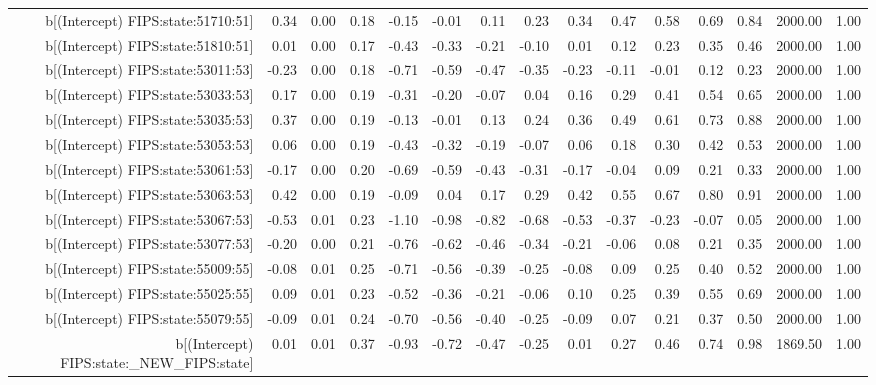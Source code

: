 \begin{table}[ht]
\begin{tabular}{rrrrrrrrrrrrrrr}
  b[(Intercept) FIPS:state:51710:51] & 0.34 & 0.00 & 0.18 & -0.15 & -0.01 & 0.11 & 0.23 & 0.34 & 0.47 & 0.58 & 0.69 & 0.84 & 2000.00 & 1.00 \\ 
  b[(Intercept) FIPS:state:51810:51] & 0.01 & 0.00 & 0.17 & -0.43 & -0.33 & -0.21 & -0.10 & 0.01 & 0.12 & 0.23 & 0.35 & 0.46 & 2000.00 & 1.00 \\ 
  b[(Intercept) FIPS:state:53011:53] & -0.23 & 0.00 & 0.18 & -0.71 & -0.59 & -0.47 & -0.35 & -0.23 & -0.11 & -0.01 & 0.12 & 0.23 & 2000.00 & 1.00 \\ 
  b[(Intercept) FIPS:state:53033:53] & 0.17 & 0.00 & 0.19 & -0.31 & -0.20 & -0.07 & 0.04 & 0.16 & 0.29 & 0.41 & 0.54 & 0.65 & 2000.00 & 1.00 \\ 
  b[(Intercept) FIPS:state:53035:53] & 0.37 & 0.00 & 0.19 & -0.13 & -0.01 & 0.13 & 0.24 & 0.36 & 0.49 & 0.61 & 0.73 & 0.88 & 2000.00 & 1.00 \\ 
  b[(Intercept) FIPS:state:53053:53] & 0.06 & 0.00 & 0.19 & -0.43 & -0.32 & -0.19 & -0.07 & 0.06 & 0.18 & 0.30 & 0.42 & 0.53 & 2000.00 & 1.00 \\ 
  b[(Intercept) FIPS:state:53061:53] & -0.17 & 0.00 & 0.20 & -0.69 & -0.59 & -0.43 & -0.31 & -0.17 & -0.04 & 0.09 & 0.21 & 0.33 & 2000.00 & 1.00 \\ 
  b[(Intercept) FIPS:state:53063:53] & 0.42 & 0.00 & 0.19 & -0.09 & 0.04 & 0.17 & 0.29 & 0.42 & 0.55 & 0.67 & 0.80 & 0.91 & 2000.00 & 1.00 \\ 
  b[(Intercept) FIPS:state:53067:53] & -0.53 & 0.01 & 0.23 & -1.10 & -0.98 & -0.82 & -0.68 & -0.53 & -0.37 & -0.23 & -0.07 & 0.05 & 2000.00 & 1.00 \\ 
  b[(Intercept) FIPS:state:53077:53] & -0.20 & 0.00 & 0.21 & -0.76 & -0.62 & -0.46 & -0.34 & -0.21 & -0.06 & 0.08 & 0.21 & 0.35 & 2000.00 & 1.00 \\ 
  b[(Intercept) FIPS:state:55009:55] & -0.08 & 0.01 & 0.25 & -0.71 & -0.56 & -0.39 & -0.25 & -0.08 & 0.09 & 0.25 & 0.40 & 0.52 & 2000.00 & 1.00 \\ 
  b[(Intercept) FIPS:state:55025:55] & 0.09 & 0.01 & 0.23 & -0.52 & -0.36 & -0.21 & -0.06 & 0.10 & 0.25 & 0.39 & 0.55 & 0.69 & 2000.00 & 1.00 \\ 
  b[(Intercept) FIPS:state:55079:55] & -0.09 & 0.01 & 0.24 & -0.70 & -0.56 & -0.40 & -0.25 & -0.09 & 0.07 & 0.21 & 0.37 & 0.50 & 2000.00 & 1.00 \\ 
  b[(Intercept) FIPS:state:\_NEW\_FIPS:state] & 0.01 & 0.01 & 0.37 & -0.93 & -0.72 & -0.47 & -0.25 & 0.01 & 0.27 & 0.46 & 0.74 & 0.98 & 1869.50 & 1.00 \\ 

\end{tabular}
\end{table}
